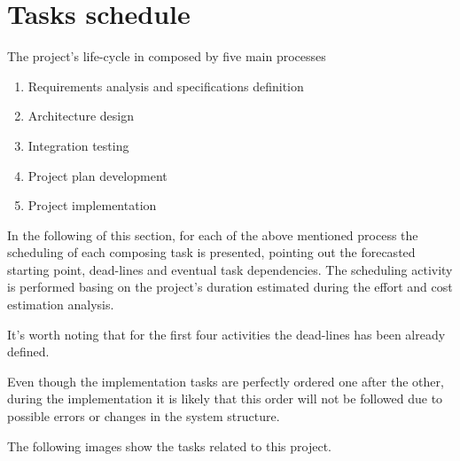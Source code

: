 \section{Tasks schedule}

The project's life-cycle in composed by five main processes

\begin{enumerate}
	\item Requirements analysis and specifications definition
	\item Architecture design 
	\item Integration testing
	\item Project plan development
	\item Project implementation
\end{enumerate}

In the following of this section, for each of the above mentioned process the scheduling of each composing task is presented, pointing out the forecasted starting point, dead-lines and eventual task dependencies.
The scheduling activity is performed basing on the project's duration estimated during the effort and cost estimation analysis.

It's worth noting that for the first four activities the dead-lines has been already defined.

Even though the implementation tasks are perfectly ordered one after the other, during the implementation it is likely that this order will not be followed due to possible errors or changes in the system structure.

The following images show the tasks related to this project.

